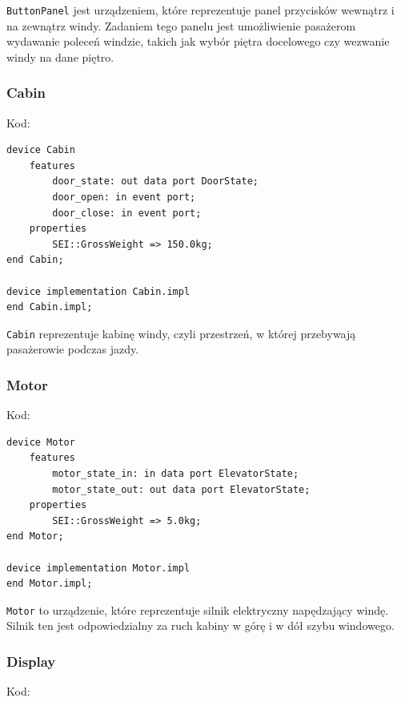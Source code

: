 \documentclass{article}
\begin{document}
    \texttt{ButtonPanel} jest urządzeniem, które reprezentuje panel przycisków wewnątrz i na zewnątrz windy. Zadaniem tego panelu jest umożliwienie pasażerom wydawanie poleceń windzie, takich jak wybór piętra docelowego czy wezwanie windy na dane piętro.


    \newpage

    \subsubsection{Cabin}

    Kod:
    
    \begin{lstlisting}[basicstyle=\ttfamily, keywordstyle=\bfseries]
device Cabin
    features
        door_state: out data port DoorState;
        door_open: in event port;
        door_close: in event port;
    properties
        SEI::GrossWeight => 150.0kg;
end Cabin;

device implementation Cabin.impl
end Cabin.impl;
    \end{lstlisting}

    \texttt{Cabin} reprezentuje kabinę windy, czyli przestrzeń, w której przebywają pasażerowie podczas jazdy. 




    \subsubsection{Motor}

    Kod:
    
    \begin{lstlisting}[basicstyle=\ttfamily, keywordstyle=\bfseries]
device Motor
    features
        motor_state_in: in data port ElevatorState;
        motor_state_out: out data port ElevatorState;
    properties
        SEI::GrossWeight => 5.0kg;
end Motor;

device implementation Motor.impl
end Motor.impl;
    \end{lstlisting}

    \texttt{Motor} to urządzenie, które reprezentuje silnik elektryczny napędzający windę. Silnik ten jest odpowiedzialny za ruch kabiny w górę i w dół szybu windowego.



    \subsubsection{Display}

    Kod:
    
\end{document}
